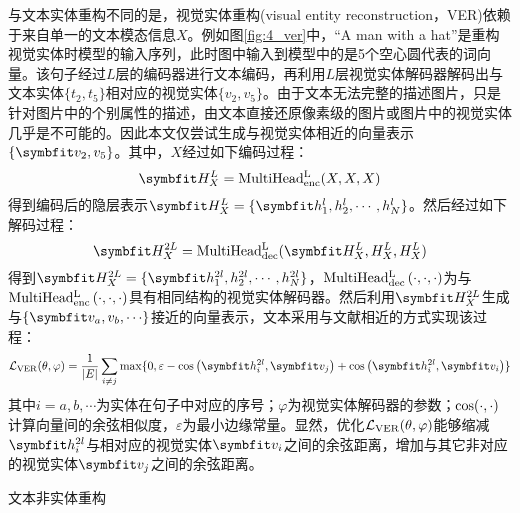 
与文本实体重构不同的是，视觉实体重构(visual entity reconstruction，VER)依赖于来自单一的文本模态信息$X$。例如图\ref{fig:4_ver}中，“A man with a hat”是重构视觉实体时模型的输入序列，此时图中输入到模型中的是5个空心圆代表的词向量。该句子经过$L$层的编码器进行文本编码，再利用$L$层视觉实体解码器解码出与文本实体$\{t_2,t_5\}$相对应的视觉实体$\{v_2,v_5\}$。由于文本无法完整的描述图片，只是针对图片中的个别属性的描述，由文本直接还原像素级的图片或图片中的视觉实体几乎是不可能的。因此本文仅尝试生成与视觉实体相近的向量表示$\{\Vector{v_2,v_5}\}$。其中，$X$经过如下编码过程：
\begin{equation}
\Vector{H_X^L}={\rm{MultiHead_{enc}^L}}(X, X, X)
\end{equation}
得到编码后的隐层表示$\Vector{H_X^L}=\{\Vector{h_1^l,h_2^l,\cdots,h_N^l}\}$。然后经过如下解码过程：
\begin{equation}
\Vector{H_X^{2L}}={\rm{MultiHead_{dec}^L}}(\Vector{H_X^L, H_X^L, H_X^L})
\end{equation}
得到$\Vector{H_X^{2L}}=\{\Vector{h_1^{2l},h_2^{2l},\cdots,h_N^{2l}}\}$，${\rm MultiHead_{dec}^L}\left( \cdot,\cdot,\cdot \right)$为与${\rm MultiHead_{enc}^L}\left( \cdot,\cdot,\cdot \right)$具有相同结构的视觉实体解码器。然后利用$\Vector{H_X^{2L}}$生成与$\{\Vector{v_a,v_b,\cdots}\}$接近的向量表示，文本采用与文献\cite{37_elliott-kadar-2017-imagination}相近的方式实现该过程：
\begin{equation}
\mathcal{L}_{\rm{VER}}(\theta, \varphi)=
    \frac{1}{{\vert}E{\vert}}
    \mathop{\sum}_{i \neq j}{\max}\{0, \varepsilon - {\rm{cos}}\left( \Vector{h_i^{2l}}, \Vector{v_j} \right) + {\rm{cos}}\left( \Vector{h_i^{2l}}, \Vector{v_i} \right)\}
\end{equation}
%
其中$i=a,b,\cdots$为实体在句子中对应的序号；$\varphi$为视觉实体解码器的参数；${\rm{cos}}(\cdot,\cdot)$计算向量间的余弦相似度，$\varepsilon$为最小边缘常量。显然，优化$\mathcal{L}_{\rm{VER}}(\theta,\varphi)$能够缩减$\Vector{h_i^{2l}}$与相对应的视觉实体$\Vector{v_i}$之间的余弦距离，增加与其它非对应的视觉实体$\Vector{v_j}$之间的余弦距离。

{\sffamily 文本非实体重构}

